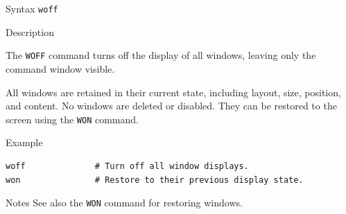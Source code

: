 %
%
\pagebreak
{}

\begin{iPageDescEntry}{Syntax}
\texttt{woff} \\
\end{iPageDescEntry}

\begin{iPageDescEntry}{Description}

The \texttt{WOFF} command turns off the display of all windows, leaving only
the command window visible.

All windows are retained in their current state, including layout, size,
position, and content. No windows are deleted or disabled. They can be
restored to the screen using the \texttt{WON} command.

\end{iPageDescEntry}

\begin{iPageDescOpEntry}{Example}
\begin{lstlisting}[style=iPageOpStyle]
woff              # Turn off all window displays.
won               # Restore to their previous display state.
\end{lstlisting}
\end{iPageDescOpEntry}

\begin{iPageDescEntry}{Notes}
See also the \texttt{WON} command for restoring windows.
\end{iPageDescEntry}
